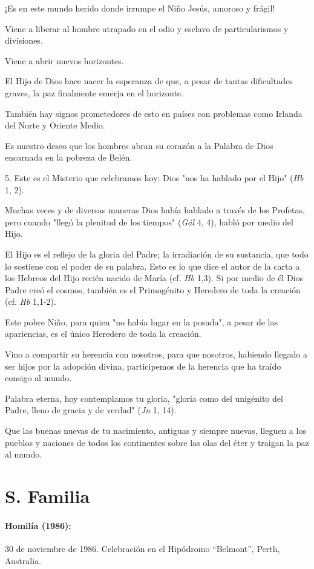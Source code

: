 \begin{body}
\begin{body}
¡Es en este mundo herido donde irrumpe el Niño Jesús, amoroso y frágil!

Viene a liberar al hombre atrapado en el odio y esclavo de particularismos y divisiones.

Viene a abrir nuevos horizontes.

El Hijo de Dios hace nacer la esperanza de que, a pesar de tantas dificultades graves, la paz finalmente emerja en el horizonte.

También hay signos prometedores de esto en países con problemas como Irlanda del Norte y Oriente Medio.

Es nuestro deseo que los hombres abran su corazón a la Palabra de Dios encarnada en la pobreza de Belén.

5. Este es el Misterio que celebramos hoy: Dios "nos ha hablado por el Hijo" (\emph{Hb} 1, 2).

Muchas veces y de diversas maneras Dios había hablado a través de los Profetas, pero cuando "llegó la plenitud de los tiempos" (\emph{Gál} 4, 4), habló por medio del Hijo.

El Hijo es el reflejo de la gloria del Padre; la irradiación de su sustancia, que todo lo sostiene con el poder de su palabra. Esto es lo que dice el autor de la carta a los Hebreos del Hijo recién nacido de María (cf. \emph{Hb} 1,3). Si por medio de él Dios Padre creó el cosmos, también es el Primogénito y Heredero de toda la creación (cf. \emph{Hb} 1,1-2).

Este pobre Niño, para quien "no había lugar en la posada", a pesar de las apariencias, es el único Heredero de toda la creación.

Vino a compartir su herencia con nosotros, para que nosotros, habiendo llegado a ser hijos por la adopción divina, participemos de la herencia que ha traído consigo al mundo.

Palabra eterna, hoy contemplamos tu gloria, "gloria como del unigénito del Padre, lleno de gracia y de verdad" (\emph{Jn} 1, 14).

Que las buenas nuevas de tu nacimiento, antiguas y siempre nuevas, lleguen a los pueblos y naciones de todos los continentes sobre las olas del éter y traigan la paz al mundo.
\end{body} 


\chapter{S. Familia}

\subsubsection{Homilía (1986): } 30 de noviembre de 1986. Celebración en el Hipódromo ``Belmont'', Perth, Australia.


\end{body}
